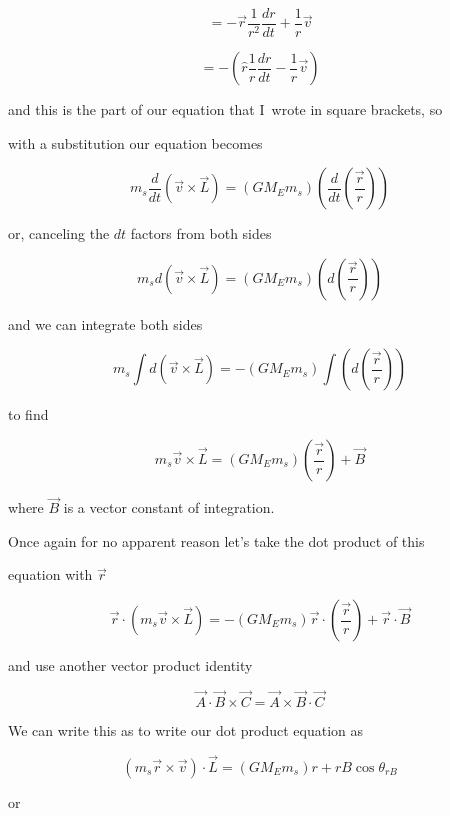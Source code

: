 $$=-\overrightarrow{r}\frac{1}{r^{2}}\frac{dr}{dt}+\frac{1}{r}\overrightarrow{v}
$$

$$=-\left( \hat{r}\frac{1}{r}\frac{dr}{dt}-\frac{1}{r}\overrightarrow{v}\right)$$

and this is the part of our equation that I\ wrote in square brackets, so

with a substitution our equation becomes%

$$m_{s}\frac{d}{dt}\left( \overrightarrow{v}\times \overrightarrow{L}\right)=\left( GM_{E}m_{s}\right) \left( \frac{d}{dt}\left( \frac{\overrightarrow{r}}{r}\right) \right) $$

or, canceling the $dt$ factors from both sides%

$$m_{s}d\left( \overrightarrow{v}\times \overrightarrow{L}\right) =\left(GM_{E}m_{s}\right) \left( d\left( \frac{\overrightarrow{r}}{r}\right)\right)
$$

and we can integrate both sides%

$$m_{s}\int d\left( \overrightarrow{v}\times \overrightarrow{L}\right)=-\left( GM_{E}m_{s}\right) \int \left( d\left( \frac{\overrightarrow{r}}{r}\right) \right)
$$

to find 

$$m_{s}\overrightarrow{v}\times \overrightarrow{L}=\left( GM_{E}m_{s}\right)\left( \frac{\overrightarrow{r}}{r}\right) +\overrightarrow{B}
$$

where $\overrightarrow{B}$ is a vector constant of integration.


Once again for no apparent reason let's take the dot product of this

equation with $\overrightarrow{r}$%

$$\overrightarrow{r}\cdot \left( m_{s}\overrightarrow{v}\times \overrightarrow{L}\right) =-\left( GM_{E}m_{s}\right) \overrightarrow{r}\cdot \left( \frac{\overrightarrow{r}}{r}\right) +\overrightarrow{r}\cdot \overrightarrow{B} 
$$

and use another vector product identity%

$$\overrightarrow{A}\cdot \overrightarrow{B}\times \overrightarrow{C}=\overrightarrow{A}\times \overrightarrow{B}\cdot \overrightarrow{C} 
$$

We can write this as to write our dot product equation as 

$$\left( m_{s}\overrightarrow{r}\times \overrightarrow{v}\right) \cdot \overrightarrow{L}=\left( GM_{E}m_{s}\right) r+rB\cos \theta _{rB} 
$$

or

